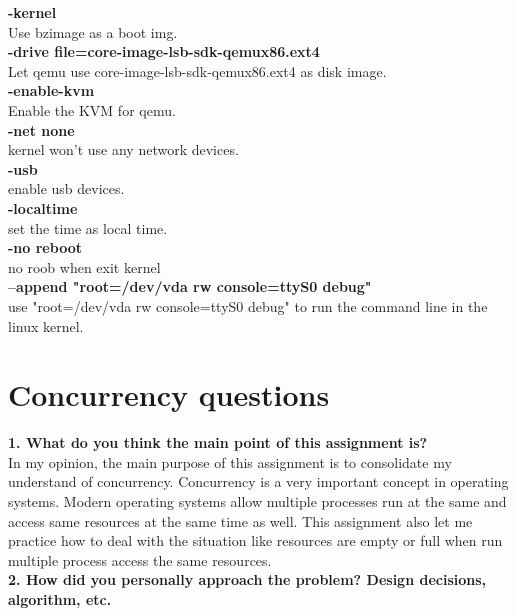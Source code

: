\documentclass[10pt,letterpaper]{article}
\begin{document}
\textbf{-kernel}\\
Use bzimage as a boot img.\\
 
\textbf{-drive file=core-image-lsb-sdk-qemux86.ext4}\\
Let qemu use core-image-lsb-sdk-qemux86.ext4 as disk image.\\
 
\textbf{-enable-kvm}\\
Enable the KVM for qemu.\\
 
\textbf{-net none}\\
kernel won't use any network devices.\\

\textbf{-usb}\\
enable usb devices.\\

\textbf{-localtime}\\
set the time as local time.\\

\textbf{-no reboot}\\
no roob when exit kernel\\

\textbf{--append "root=/dev/vda rw console=ttyS0 debug"}\\
use "root=/dev/vda rw console=ttyS0 debug" to run the command line in the linux kernel.\\


\section{Concurrency questions}

\textbf{}

\textbf{1. What do you think the main point of this assignment is?}\\

In my opinion, the main purpose of this assignment is to consolidate my understand of concurrency. Concurrency is a very important concept in operating systems. Modern operating systems allow multiple processes run at the same and access same resources at the same time as well. This assignment also let me practice how to deal with the situation like resources are empty or full when run multiple process access the same resources.\\

\textbf{2. How did you personally approach the problem? Design decisions, algorithm, etc.}\\
\end{document}

